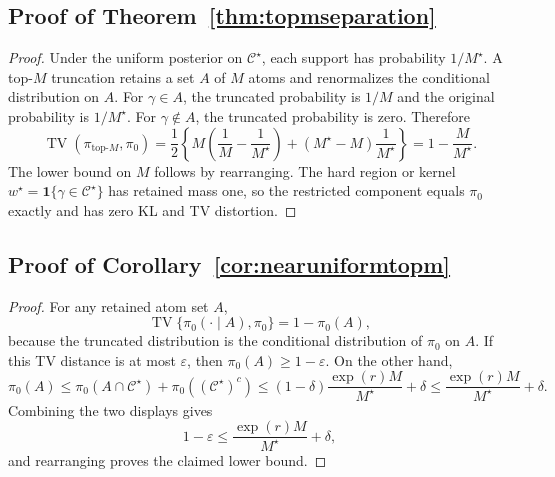 \documentclass[twoside,11pt]{article}
\newcommand{\ind}{\mathbf{1}}
\newcommand{\TV}{\operatorname{TV}}
\begin{document}
\subsection{Proof of Theorem~\ref{thm:topmseparation}}

\begin{proof} Under the uniform posterior on $\mathcal C^\star$, each support has probability $1/M^\star$. A top-$M$ truncation retains a set $A$ of $M$ atoms and renormalizes the conditional distribution on $A$. For $\gamma\in A$, the truncated probability is $1/M$ and the original probability is $1/M^\star$. For $\gamma\notin A$, the truncated probability is zero. Therefore
\[
\TV(\pi_{\mathrm{top}\text{-}M},\pi_0) = \frac12\left\{ M\left(\frac1M-\frac1{M^\star}\right) +(M^\star-M)\frac1{M^\star} \right\} = 1-\frac{M}{M^\star}.
\]
The lower bound on \(M\) follows by rearranging. The hard region or kernel \(w^\star=\ind\{\gamma\in\mathcal C^\star\}\) has retained mass one, so the restricted component equals \(\pi_0\) exactly and has zero KL and TV distortion.
\end{proof}

\subsection{Proof of Corollary~\ref{cor:nearuniformtopm}}

\begin{proof} For any retained atom set $A$,
\[
\TV\{\pi_0(\cdot\mid A),\pi_0\} = 1-\pi_0(A),
\]
because the truncated distribution is the conditional distribution of $\pi_0$ on $A$. If this TV distance is at most $\varepsilon$, then $\pi_0(A)\ge1-\varepsilon$. On the other hand,
\[
\pi_0(A) \le \pi_0(A\cap \mathcal C^\star)+\pi_0((\mathcal C^\star)^c) \le (1-\delta)\frac{\exp(r)M}{M^\star}+\delta \le \frac{\exp(r)M}{M^\star}+\delta .
\]
Combining the two displays gives
\[
1-\varepsilon \le \frac{\exp(r)M}{M^\star}+\delta,
\]
and rearranging proves the claimed lower bound.
\end{proof}

\fi

\end{document}
